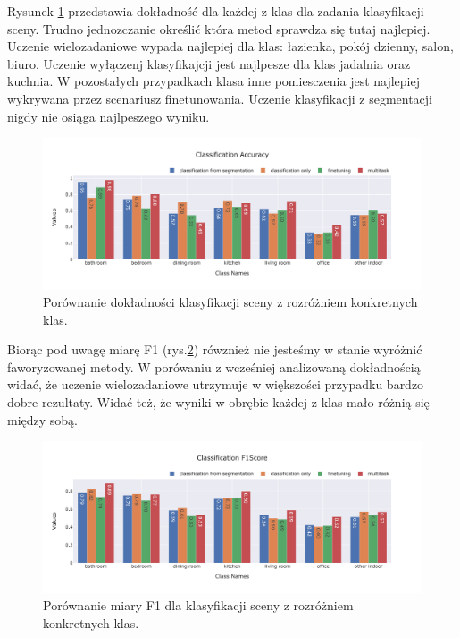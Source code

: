 \vspace{0.5cm}
Rysunek \ref{fig:classification-accuracy} przedstawia dokładność dla każdej z klas dla zadania klasyfikacji sceny. Trudno jednozczanie określić która metod sprawdza się tutaj najlepiej. Uczenie wielozadaniowe wypada najlepiej dla klas: łazienka, pokój dzienny, salon, biuro. Uczenie wyłączenj klasyfikajcji jest najlpesze dla klas jadalnia oraz  kuchnia. W pozostałych przypadkach klasa inne pomiesczenia jest najlepiej wykrywana przez scenariusz finetunowania. Uczenie klasyfikacji z segmentacji nigdy nie osiąga najlpeszego wyniku.
\begin{figure}[ht!]
    \centering
    \includegraphics[width=\textwidth]{result_imgs_sorted/Classification-Accuracy.jpeg}
    \caption{Porównanie dokładności klasyfikacji sceny z rozróżniem konkretnych klas.}
    \label{fig:classification-accuracy}
\end{figure}
Biorąc pod uwagę miarę F1 (rys.\ref{fig:classification-f1}) rówznież nie jesteśmy w stanie wyróżnić faworyzowanej metody. W porówaniu z wcześniej analizowaną dokładnością widać, że uczenie wielozadaniowe utrzymuje w większości przypadku bardzo dobre rezultaty. Widać też, że wyniki w obrębie każdej z klas mało różnią się między sobą.
\begin{figure}[ht!]
    \centering
    \includegraphics[width=\textwidth]{result_imgs_sorted/Classification-F1Score.jpeg}
    \caption{Porównanie miary F1 dla klasyfikacji sceny z rozróżniem konkretnych klas.}
    \label{fig:classification-f1}
\end{figure}


